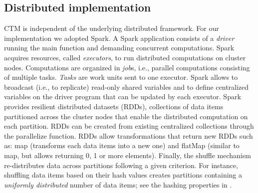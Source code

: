 \documentclass[
]{ceurart}
\renewcommand{\sf}[1]{\textsf{\textup{#1}}}
\begin{document}
\subsection{Distributed implementation}
CTM is independent of the underlying distributed framework.
For our implementation we adopted Spark.
A Spark application consists of a \textit{driver} running the main function and demanding concurrent computations.
Spark acquires resources, called \textit{executors}, to run distributed computations on cluster nodes.
Computations are organized in  \textit{job}s, i.e., parallel computations consisting of multiple tasks.
\textit{Tasks} are work units sent to one executor.
Spark allows to \sf{broadcast} (i.e., to replicate) read-only shared variables and to define centralized variables on the driver program that can be updated by each executor.
Spark provides resilient distributed datasets (RDDs), collections of data items partitioned across the cluster nodes that enable the distributed computation on each partition.
RDDs can be created from existing centralized collections through the \sf{parallelize} function.
RDDs allow transformations that return new RDDs such as: \sf{map} (transforms each data items into a new one) and \sf{flatMap} (similar to \sf{map}, but allows returning 0, 1 or more elements).
Finally, the \sf{shuffle} mechanism re-distributes data across partitions following a given criterion.
For instance, shuffling data items based on their hash values
creates partitions containing a \textit{uniformly distributed} number of data items; see the hashing properties in \cite{menezes2018handbook}.
\end{document}
